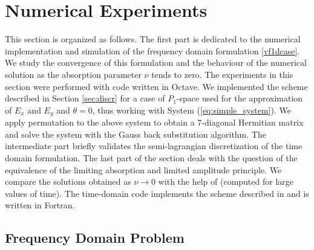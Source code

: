 
\section{Numerical Experiments}
This section is organized as follows. The first part is dedicated to the numerical implementation and simulation 
of the frequency domain formulation \eqref{vf1dcase}. We study the convergence of this formulation and the behaviour 
of the numerical solution as the absorption parameter $\nu$ tends to zero. The experiments in this section were 
performed with  code written in Octave.  
We implemented the scheme described in Section \ref{sec:discr} for a case of $P_{1}$-space used 
for the approximation of $E_{x}$ and $E_{y}$ and $\theta=0$, thus working with System (\ref{eq:simple_system}). 
We apply permutation to the above system 
to obtain a 7-diagonal Hermitian matrix and solve the system with the Gauss back substitution algorithm. 
The intermediate part briefly validates the semi-lagrangian discretization of the time domain formulation.
The last part of the section deals with the question of the equivalence of the limiting absorption and limited amplitude 
principle. We compare the solutions obtained as $\nu\rightarrow 0$ with the help of (computed for large values of time). 
The time-domain code implements the scheme described in  and 
is written in Fortran.
 
\subsection{Frequency Domain Problem}
\label{sec:freq_dep}
